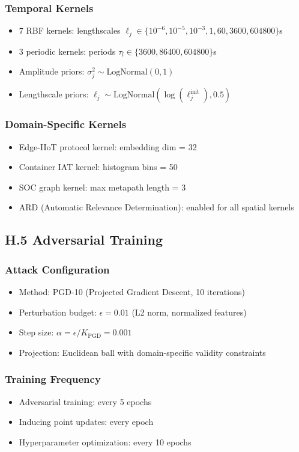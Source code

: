\documentclass[12pt]{article}
\begin{document}
\subsubsection{Temporal Kernels}
\begin{itemize}
\item 7 RBF kernels: lengthscales $\ell_j \in \{10^{-6}, 10^{-5}, 10^{-3}, 1, 60, 3600, 604800\}$s
\item 3 periodic kernels: periods $\tau_l \in \{3600, 86400, 604800\}$s
\item Amplitude priors: $\sigma_j^2 \sim \text{LogNormal}(0, 1)$
\item Lengthscale priors: $\ell_j \sim \text{LogNormal}(\log(\ell_j^{\text{init}}), 0.5)$
\end{itemize}

\subsubsection{Domain-Specific Kernels}
\begin{itemize}
\item Edge-IIoT protocol kernel: embedding dim = 32
\item Container IAT kernel: histogram bins = 50
\item SOC graph kernel: max metapath length = 3
\item ARD (Automatic Relevance Determination): enabled for all spatial kernels
\end{itemize}

\subsection{H.5 Adversarial Training}

\subsubsection{Attack Configuration}
\begin{itemize}
\item Method: PGD-10 (Projected Gradient Descent, 10 iterations)
\item Perturbation budget: $\epsilon = 0.01$ (L2 norm, normalized features)
\item Step size: $\alpha = \epsilon / K_{\text{PGD}} = 0.001$
\item Projection: Euclidean ball with domain-specific validity constraints
\end{itemize}

\subsubsection{Training Frequency}
\begin{itemize}
\item Adversarial training: every 5 epochs
\item Inducing point updates: every epoch
\item Hyperparameter optimization: every 10 epochs
\end{itemize}
\end{document}
